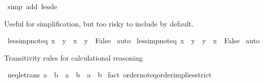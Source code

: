 \begin{isabellebody}
%
\isadelimproof
%
\endisadelimproof
%
\isatagproof
{}\isamarkupfalse%
\ {\isacharparenleft}{\kern0pt}simp\ add{\isacharcolon}{\kern0pt}\ less{\isacharunderscore}{\kern0pt}le{\isacharparenright}{\kern0pt}%
\endisatagproof
{\isafoldproof}%
%
\isadelimproof
%
\endisadelimproof
%
\begin{isamarkuptext}%
Useful for simplification, but too risky to include by default.%
\end{isamarkuptext}\isamarkuptrue%
\isamarkupfalse%
\ less{\isacharunderscore}{\kern0pt}imp{\isacharunderscore}{\kern0pt}not{\isacharunderscore}{\kern0pt}eq{\isacharcolon}{\kern0pt}\ {\isachardoublequoteopen}x\ {\isacharless}{\kern0pt}\ y\ {\isasymLongrightarrow}\ {\isacharparenleft}{\kern0pt}x\ {\isacharequal}{\kern0pt}\ y{\isacharparenright}{\kern0pt}\ {\isasymlongleftrightarrow}\ False{\isachardoublequoteclose}\isanewline
%
\isadelimproof
%
\endisadelimproof
%
\isatagproof
{}\isamarkupfalse%
\ auto%
\endisatagproof
{\isafoldproof}%
%
\isadelimproof
\isanewline
%
\endisadelimproof
\isanewline
{}\isamarkupfalse%
\ less{\isacharunderscore}{\kern0pt}imp{\isacharunderscore}{\kern0pt}not{\isacharunderscore}{\kern0pt}eq{}{\isacharcolon}{\kern0pt}\ {\isachardoublequoteopen}x\ {\isacharless}{\kern0pt}\ y\ {\isasymLongrightarrow}\ {\isacharparenleft}{\kern0pt}y\ {\isacharequal}{\kern0pt}\ x{\isacharparenright}{\kern0pt}\ {\isasymlongleftrightarrow}\ False{\isachardoublequoteclose}\isanewline
%
\isadelimproof
%
\endisadelimproof
%
\isatagproof
{}\isamarkupfalse%
\ auto%
\endisatagproof
{\isafoldproof}%
%
\isadelimproof
%
\endisadelimproof
%
\begin{isamarkuptext}%
Transitivity rules for calculational reasoning%
\end{isamarkuptext}\isamarkuptrue%
\isamarkupfalse%
\ neq{\isacharunderscore}{\kern0pt}le{\isacharunderscore}{\kern0pt}trans{\isacharcolon}{\kern0pt}\ {\isachardoublequoteopen}a\ {\isasymnoteq}\ b\ {\isasymLongrightarrow}\ a\ {\isasymle}\ b\ {\isasymLongrightarrow}\ a\ {\isacharless}{\kern0pt}\ b{\isachardoublequoteclose}\isanewline
%
\isadelimproof
%
\endisadelimproof
%
\isatagproof
{}\isamarkupfalse%
\ {\isacharparenleft}{\kern0pt}fact\ order{\isachardot}{\kern0pt}not{\isacharunderscore}{\kern0pt}eq{\isacharunderscore}{\kern0pt}order{\isacharunderscore}{\kern0pt}implies{\isacharunderscore}{\kern0pt}strict{\isacharparenright}{\kern0pt}%
\endisatagproof
{\isafoldproof}%
%
\isadelimproof
\isanewline
%
\endisadelimproof
\isanewline

\end{isabellebody}
